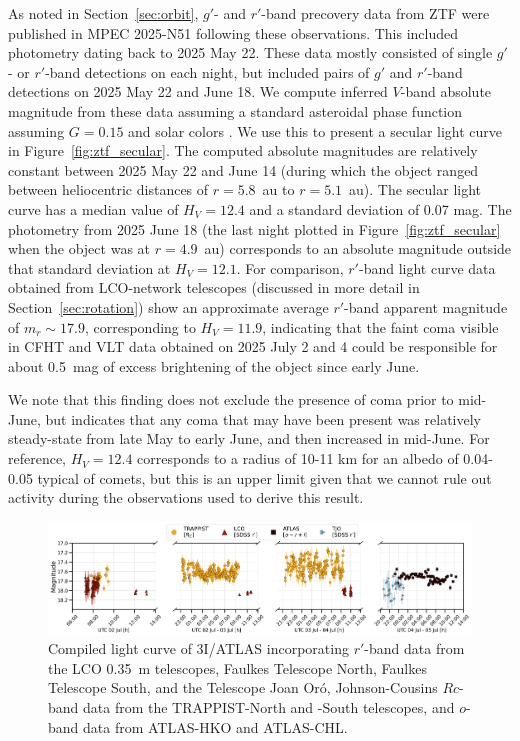 \documentclass[twocolumn,longbib]{aastex7}
\begin{document}
\begin{CJK*}{UTF8}{gbsn}
As noted in Section~\ref{sec:orbit},  $g'$- and $r'$-band precovery data from ZTF were published in MPEC 2025-N51 following these observations. This included photometry dating back to 2025 May 22. These data mostly consisted of single $g'$- or $r'$-band detections on each night, but included pairs of $g'$ and $r'$-band detections on 2025 May 22 and June 18. We compute inferred $V$-band absolute magnitude from these data  assuming a standard asteroidal phase function \citep{bowell1989_astphotmodels_ast2} assuming $G=0.15$ and solar colors \citep{jordi2006_filtertransformations,holmberg2006_solarcolors}. We use this to present a secular light curve  in Figure~\ref{fig:ztf_secular}. The computed absolute magnitudes are relatively constant between 2025 May 22 and June 14 (during which the object ranged between heliocentric distances of $r=5.8$~au to $r=5.1$~au). The secular light curve has a median value of $H_V=12.4$ and a standard deviation of 0.07 mag. The photometry from 2025 June 18 (the last night plotted in Figure~\ref{fig:ztf_secular} when the object was at $r=4.9$~au) corresponds to an absolute magnitude outside that standard deviation at $H_V=12.1$.  For comparison, $r'$-band light curve data obtained from LCO-network telescopes (discussed in more detail in Section~\ref{sec:rotation}) show an approximate average $r'$-band apparent magnitude of $m_r\sim17.9$, corresponding to $H_V=11.9$, indicating that the faint coma visible in CFHT and VLT data obtained on 2025 July 2 and 4 could be responsible for about 0.5~mag of excess brightening of the object since early June.

We note that this finding does not exclude the presence of coma prior to mid-June, but indicates that any coma that may have been present was relatively steady-state from late May to early June, and then increased in mid-June. For reference, $H_V=12.4$ corresponds to a radius of 10-11 km for an albedo of 0.04-0.05 typical of comets, but this is an upper limit given that we cannot rule out activity during the observations used to derive this result.

\begin{figure}
\includegraphics[width=1.\linewidth]{figures/lightcurve_interstellar.png}
\caption{Compiled light curve of 3I/ATLAS incorporating $r'$-band data from the LCO 0.35~m telescopes, Faulkes Telescope North, Faulkes Telescope South, and the Telescope Joan Or\'{o}, Johnson-Cousins $Rc$-band data from the TRAPPIST-North and -South telescopes, and $o$-band data from ATLAS-HKO and ATLAS-CHL.}
\label{fig:lc}
\end{figure}



\end{CJK*}
\end{document}
